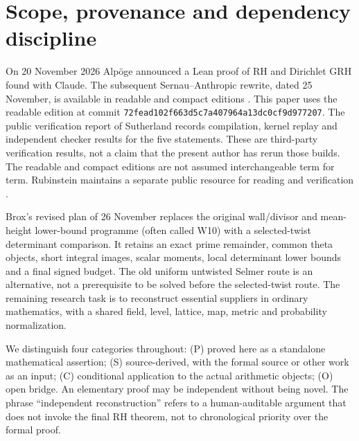 \documentclass[11pt,a4paper]{article}
\begin{document}
\section{Scope, provenance and dependency discipline}
On 20 November 2026 Alp\"oge announced a Lean proof of RH and Dirichlet GRH found with Claude. The subsequent Sernau--Anthropic rewrite, dated 25 November, is available in readable and compact editions \cite{sernau}. This paper uses the readable edition at commit \texttt{72fead102f663d5c7a407964a13dc0cf9d977207}. The public verification report of Sutherland \cite{sutherland} records compilation, kernel replay and independent checker results for the five statements. These are third-party verification results, not a claim that the present author has rerun those builds. The readable and compact editions are not assumed interchangeable term for term. Rubinstein maintains a separate public resource for reading and verification \cite{rubinstein}.

Brox's revised plan of 26 November \cite{broxplan,broxfrontier} replaces the original wall/divisor and mean-height lower-bound programme (often called W10) with a selected-twist determinant comparison. It retains an exact prime remainder, common theta objects, short integral images, scalar moments, local determinant lower bounds and a final signed budget. The old uniform untwisted Selmer route is an alternative, not a prerequisite to be solved before the selected-twist route. The remaining research task is to reconstruct essential suppliers in ordinary mathematics, with a shared field, level, lattice, map, metric and probability normalization.

We distinguish four categories throughout: (P) proved here as a standalone mathematical assertion; (S) source-derived, with the formal source or other work as an input; (C) conditional application to the actual arithmetic objects; (O) open bridge. An elementary proof may be independent without being novel. The phrase ``independent reconstruction'' refers to a human-auditable argument that does not invoke the final RH theorem, not to chronological priority over the formal proof.
\end{document}
